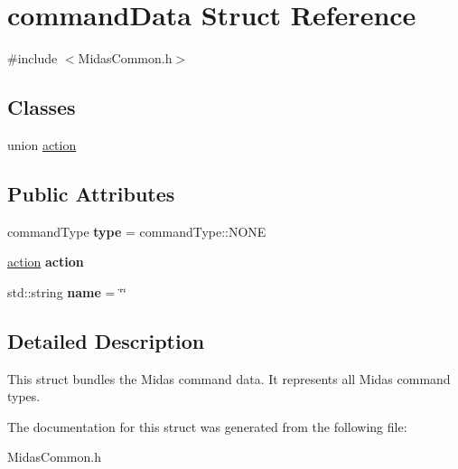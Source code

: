 \hypertarget{structcommand_data}{\section{command\+Data Struct Reference}
\label{structcommand_data}
}


{\ttfamily \#include $<$Midas\+Common.\+h$>$}

\subsection*{Classes}
\begin{DoxyCompactItemize}
\item 
union \hyperlink{unioncommand_data_1_1action}{action}
\end{DoxyCompactItemize}
\subsection*{Public Attributes}
\begin{DoxyCompactItemize}
\item 
\hypertarget{structcommand_data_a9f44362942172d20cc3f1a394df85575}{command\+Type {\bfseries type} = command\+Type\+::\+N\+O\+N\+E}\label{structcommand_data_a9f44362942172d20cc3f1a394df85575}

\item 
\hypertarget{structcommand_data_aac0b3957469660c7e91bea2327ed6aff}{\hyperlink{unioncommand_data_1_1action}{action} {\bfseries action}}\label{structcommand_data_aac0b3957469660c7e91bea2327ed6aff}

\item 
\hypertarget{structcommand_data_a39fa730095a85d68639a820a61af81b1}{std\+::string {\bfseries name} = \char`\"{}\char`\"{}}\label{structcommand_data_a39fa730095a85d68639a820a61af81b1}

\end{DoxyCompactItemize}


\subsection{Detailed Description}
This struct bundles the Midas command data. It represents all Midas command types. 

The documentation for this struct was generated from the following file\+:\begin{DoxyCompactItemize}
\item 
Midas\+Common.\+h\end{DoxyCompactItemize}
